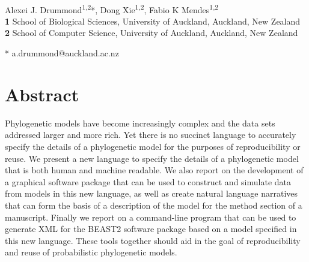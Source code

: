 \documentclass[10pt,letterpaper,table]{article}
\begin{document}
\vspace*{0.2in}

\begin{flushleft}
{\Large
\textbf{} %
}
\newline
\\
Alexei J. Drummond\textsuperscript{1,2}*,
Dong Xie\textsuperscript{1,2},
Fabio K Mendes\textsuperscript{1,2}
\\
\bigskip
\textbf{1} School of Biological Sciences, University of Auckland, Auckland, New Zealand
\\
\textbf{2} School of Computer Science, University of Auckland, Auckland, New Zealand
\\
\bigskip

% 
%

* a.drummond@auckland.ac.nz

\end{flushleft}
\section*{Abstract}
  Phylogenetic models have become increasingly complex and the data sets addressed larger and more rich.
  Yet there is no succinct language to accurately specify the details of a phylogenetic model for the purposes of reproducibility or reuse.
  We present a new language to specify the details of a phylogenetic model that is both human and machine readable.
  We also report on the development of a graphical software package that can be used to construct and simulate data from
  models in this new language, as well as create natural language narratives that can form the basis of a description of the model for the method section of a manuscript.
  Finally we report on a command-line program that can be used to generate XML for the BEAST2 software package based
  on a model specified in this new language.
  These tools together should aid in the goal of reproducibility and reuse of probabilistic phylogenetic models.
\end{document}
